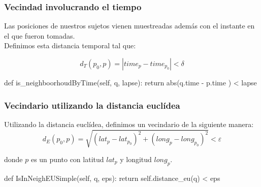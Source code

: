 \documentclass[10pt, spanish]{beamer}
\begin{document}
\begin{frame}[fragile]
\frametitle{Vecindad involucrando el tiempo}
Las posiciones de nuestros sujetos vienen muestreadas adem\'as con el instante en el que fueron tomadas.\\ \bigskip
Definimos esta distancia temporal tal que:

$$ d_T(p_0, p) = |time_p - time_{p_0}| < \delta $$

\bigskip

\begin{python}
    def is_neighboorhoudByTime(self, q, lapse):
        return abs(q.time - p.time ) < lapse
\end{python}

\end{frame}


\begin{frame}[fragile]
\frametitle{Vecindario utilizando la distancia eucl\'idea}

Utilizando la distancia eucl\'idea, definimos un vecindario de la siguiente manera:\\

$$ d_E(p_0, p) = \sqrt{(lat_{p} - lat_{p_0})^2 + (long_{p} - long_{p_0})^2 } < \varepsilon $$

donde $p$ es un punto con latitud $lat_{p}$ y longitud $long_{p}$.\\

\bigskip
\begin{python}
    def IsInNeighEUSimple(self, q, eps):
        return self.distance_eu(q) < eps
\end{python}

\end{frame}

\end{document}
